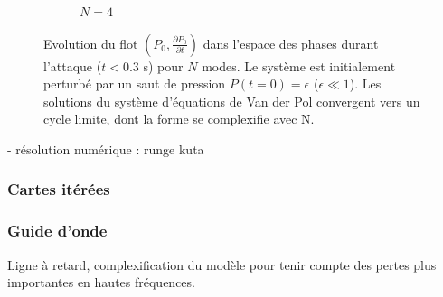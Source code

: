 \begin{figure}
\begin{subfigure}[b]{.24\linewidth}
        \caption{$N=4$}
        \label{fig:VDP_phase_N4}
    \end{subfigure}
    \caption{Evolution du flot $(P_0,\frac{\partial P_0}{\partial t})$ dans l'espace des phases durant l'attaque ($t<0.3$ s) pour $N$ modes. Le système est initialement perturbé par un saut de pression $P(t=0)=\epsilon$ ($\epsilon \ll 1$). Les solutions du système d'équations de Van der Pol convergent vers un cycle limite, dont la forme se complexifie avec N.}
    \label{fig:VDP_phase}
\end{figure}

- résolution numérique : runge kuta

\subsubsection{Cartes itérées}

\subsubsection{Guide d'onde}

Ligne à retard, complexification du modèle pour tenir compte des pertes plus importantes en hautes fréquences.